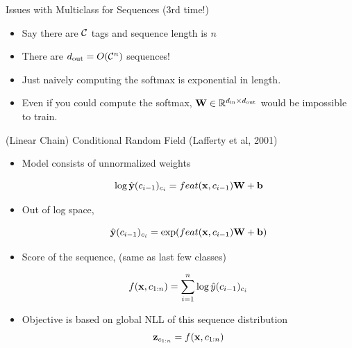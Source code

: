 \documentclass{beamer}
\begin{document}
\begin{frame}{Issues with Multiclass for Sequences (3rd time!) }
  \begin{itemize}
  \item Say there are $\mathcal{C}$ tags and sequence length is $n$
    \air 

  \item There are ${d_{\mathrm{out}}} = O(\mathcal{C}^n)$ sequences! 
    \air 
  \item Just naively computing the softmax is exponential in length. 
    \air 

  \item Even if you could compute the softmax, $\mathbf{W} \in \mathbb{R}^{{d_{\mathrm{in}}} \times {d_{\mathrm{out}}}}$ would 
    be impossible to train.
  \end{itemize}
\end{frame}

\begin{frame}{(Linear Chain) Conditional Random Field (Lafferty et al, 2001)}
  \begin{itemize}
  \item Model consists of unnormalized weights 

    \[\log \hat{\mathbf{y}}(c_{i-1})_{c_i} = feat(\mathbf{x}, c_{i-1}) \mathbf{W} + \mathbf{b}\]
    
  \item Out of log space, 

    \[ \hat{\mathbf{y}}(c_{i-1})_{c_i} = \exp(feat(\mathbf{x}, c_{i-1}) \mathbf{W} + \mathbf{b})\]

    

  \item Score of the sequence, (same as last few classes)
    
    \[ f(\mathbf{x}, c_{1:n}) = \sum_{i=1}^n \log \hat{y}(c_{i-1})_{c_{i}} \] 

  \item Objective is based on global NLL of this sequence distribution
    \[\mathbf{z}_{c_{1:n}} =  f(\mathbf{x}, c_{1:n})    \] 

  \end{itemize}
\end{frame}
\end{document}
